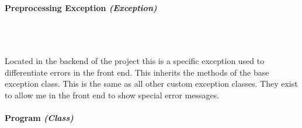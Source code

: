 \begin{FlushLeft}
    \pagebreak
\paragraph{Preprocessing Exception \textit{(Exception)}} \mbox{} \\

    \begin{figure}[H]
        \centering
    \end{figure}\\
    Located in the backend of the project this is a specific exception used to differentiate errors in the front end. This inherits the methods of the base exception class. This is the same as all other custom exception classes. They exist to allow me in the front end to show special error messages.
    \bk

    \pagebreak
\paragraph{Program \textit{(Class)}} \mbox{} \\

    \begin{figure}[H]
        \centering
    \end{figure}\\


\end{FlushLeft}
